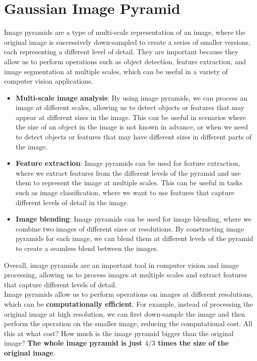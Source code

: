 \documentclass{article}
\begin{document}
\section*{Gaussian Image Pyramid}

Image pyramids are a type of multi-scale representation of an image, where the original image is successively down-sampled to create a series of smaller versions, each representing a different level of detail. They are important because they allow us to perform operations such as object detection, feature extraction, and image segmentation at multiple scales, which can be useful in a variety of computer vision applications.

\begin{itemize}
    \item \textbf{Multi-scale image analysis}: By using image pyramids, we can process an image at different scales, allowing us to detect objects or features that may appear at different sizes in the image. This can be useful in scenarios where the size of an object in the image is not known in advance, or when we need to detect objects or features that may have different sizes in different parts of the image.
    \item \textbf{Feature extraction}: Image pyramids can be used for feature extraction, where we extract features from the different levels of the pyramid and use them to represent the image at multiple scales. This can be useful in tasks such as image classification, where we want to use features that capture different levels of detail in the image.
    \item \textbf{Image blending}: Image pyramids can be used for image blending, where we combine two images of different sizes or resolutions. By constructing image pyramids for each image, we can blend them at different levels of the pyramid to create a seamless blend between the images.
\end{itemize}

Overall, image pyramids are an important tool in computer vision and image processing, allowing us to process images at multiple scales and extract features that capture different levels of detail. \\

Image pyramids allow us to perform operations on images at different resolutions, which can be \textbf{computationally efficient}. For example, instead of processing the original image at high resolution, we can first down-sample the image and then perform the operation on the smaller image, reducing the computational cost. All this at what cost? How much is the image pyramid bigger than the original image? \textbf{The whole image pyramid is just $4/3$ times the size of the original image}. 
\end{document}

